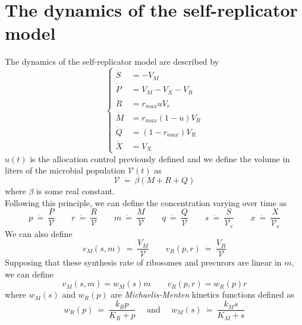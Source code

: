 \documentclass{tudelft-report}
\begin{document}
\section*{The dynamics of the self-replicator model}\noindent
The dynamics of the self-replicator model are described by
\begin{equation*}\tag{SRM-D}\label{eq:srmd}
 \begin{cases}
  \dot{S} &= -V_M\\
  \dot{P} &= V_M - V_X - V_R\\
  \dot{R} &= r_{max}uV_r\\
  \dot{M} &= r_{max}(1-u)V_R\\
  \dot{Q} &= (1-r_{max})V_R\\
  \dot{X} &= V_X
 \end{cases}
\end{equation*}\noindent
$u(t)$ is the allocation control previously defined and we define the volume in liters of the microbial population $\mathcal{V}(t)$ as
$$\mathcal{V}\ \dot{=}\ \beta (M + R + Q)$$
where $\beta$ is some real constant.\\
Following this principle, we can define the concentration varying over time as 
$$p\ \dot{=}\ \frac{P}{\mathcal{V}} \quad\quad r\ \dot{=}\ \frac{R}{\mathcal{V}} \quad\quad m\ \dot{=}\ \frac{M}{\mathcal{V}} \quad\quad q\ \dot{=}\ \frac{Q}{\mathcal{V}}\quad\quad s\ \dot{=}\ \frac{S}{\mathcal{V}_e}\quad \quad x\ \dot{=}\ \frac{X}{\mathcal{V}_e}$$
We can also define 
$$v_M(s, m)\ \dot{=}\ \frac{V_M}{\mathcal{V}}\quad\quad v_R(p, r)\ \dot{=}\ \frac{V_R}{\mathcal{V}}$$
Supposing that these synthesis rate of ribosomes and precurors are linear in $m$, we can define 
$$v_M(s,m) = w_M(s)m\quad\quad v_R(p,r) = w_R(p)r$$
where $w_M(s)$ and $w_R(p)$ are \textit{Michaelis-Menten} kinetics functions defined as 
$$w_R(p)\ \dot{=}\ \frac{k_Rp}{K_R+p}\quad \textrm{ and }\quad w_M(s) \ \dot{=}\ \frac{k_Ms}{K_M+s}$$
\end{document}

